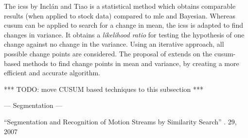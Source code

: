 The \gls{icss} by Incl\'{a}n and Tiao \cite{inclan1994use} is a statistical method which obtains comparable results (when applied to stock data) compared to \gls{mle} and Bayesian.
Whereas \gls{cusum} can be applied to search for a change in mean, the \gls{icss} is adapted to find changes in variance.
It obtains a \emph{likelihood ratio} for testing the hypothesis of one change against no change in the variance.
Using an iterative approach, all possible change points are considered.
The proposal of \cite{cheng2009efficient} extends on the \gls{cusum}-based methods to find change points in mean and variance, by creating a more efficient and accurate algorithm.

*** TODO: move CUSUM based techniques to this subsection ***




--- Segmentation ---





``Segmentation and Recognition of Motion Streams by Similarity Search'' \cite{li2007segmentation}. 29, 2007 \\




